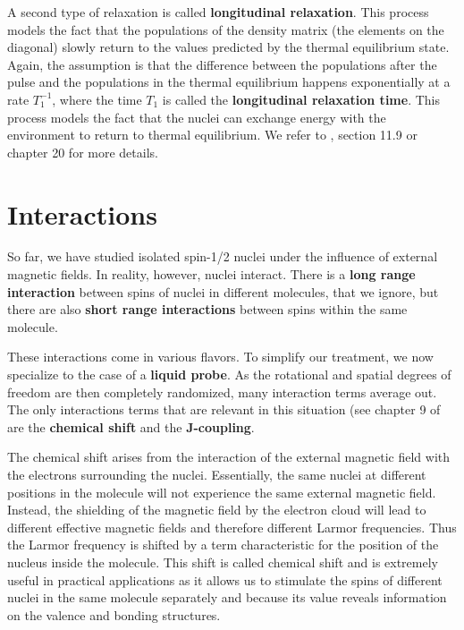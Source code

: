 \documentclass[a4paper, draft]{article}
\theoremstyle{own}
\theoremstyle{remark}
\begin{document}
A second type of relaxation is called {\bf longitudinal relaxation}. This process models the fact that the populations of the density matrix (the elements on the diagonal) slowly return to the values predicted by the thermal equilibrium state. Again, the assumption is that the difference between the populations after the pulse and the populations in the thermal equilibrium happens exponentially at a rate $T_1^{-1}$, where the time $T_1$ is called the {\bf longitudinal relaxation time}. This process models the fact that the nuclei can exchange energy with the environment to return to thermal equilibrium. We refer to \cite{Levitt}, section 11.9 or chapter 20 for more details. 


\section{Interactions}

So far, we have studied isolated spin-1/2 nuclei under the influence of external magnetic fields. In reality, however, nuclei interact. There is a {\bf long range interaction} between spins of nuclei in different molecules, that we ignore, but there are also {\bf short range interactions} between spins within the same molecule. 

These interactions come in various flavors. To simplify our treatment, we now specialize to the case of a {\bf liquid probe}. As the rotational and spatial degrees of freedom are then completely randomized, many interaction terms average out. The only interactions terms that are relevant in this situation (see chapter 9 of \cite{Levitt} are the {\bf chemical shift} and the {\bf J-coupling}.
	
The chemical shift arises from the interaction of the external magnetic field with the electrons surrounding the nuclei. Essentially, the same nuclei at different positions in the molecule will not experience the same external magnetic field. Instead, the shielding of the magnetic field by the electron cloud will lead to different effective magnetic fields and therefore different Larmor frequencies. Thus the Larmor frequency is shifted by a term characteristic for the position of the nucleus inside the molecule. This shift is called chemical shift and is extremely useful in practical applications as it allows us to stimulate the spins of different nuclei in the same molecule separately and because its value reveals information on the valence and bonding structures.
\end{document}
